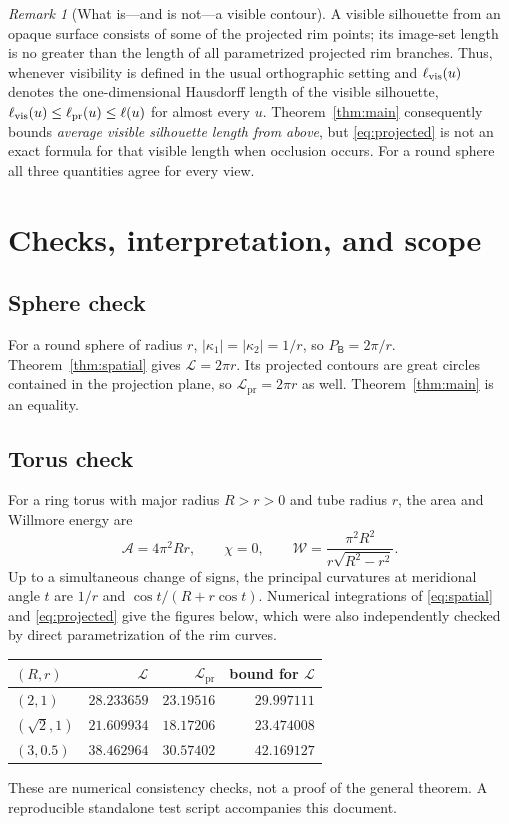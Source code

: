 \documentclass[10pt,a4paper]{article}
\theoremstyle{remark}\newtheorem{remark}[theorem]{Remark}
\newcommand{\A}{\mathcal A}
\newcommand{\W}{\mathcal W}
\newcommand{\Lc}{\mathcal L}
\newcommand{\Lp}{\mathcal L_{\mathrm{pr}}}
\newcommand{\Bop}{\mathsf B}
\begin{document}
\begin{remark}[What is---and is not---a visible contour]\label{rem:visible}
A visible silhouette from an opaque surface consists of some of the projected rim points; its image-set length is no greater than the length of all parametrized projected rim branches. Thus, whenever visibility is defined in the usual orthographic setting and $\ell_{\rm vis}(u)$ denotes the one-dimensional Hausdorff length of the visible silhouette,
$\ell_{\rm vis}(u)\leq\ell_{\rm pr}(u)\leq\ell(u)$ for almost every $u$.
Theorem~\ref{thm:main} consequently bounds \emph{average visible silhouette length from above}, but \eqref{eq:projected} is not an exact formula for that visible length when occlusion occurs. For a round sphere all three quantities agree for every view.
\end{remark}

\section{Checks, interpretation, and scope}
\subsection*{Sphere check}
For a round sphere of radius $r$, $|\kappa_1|=|\kappa_2|=1/r$, so $P_\Bop=2\pi/r$. Theorem~\ref{thm:spatial} gives $\Lc=2\pi r$. Its projected contours are great circles contained in the projection plane, so $\Lp=2\pi r$ as well. Theorem~\ref{thm:main} is an equality.

\subsection*{Torus check}
For a ring torus with major radius $R>r>0$ and tube radius $r$, the area and Willmore energy are
\[
\A=4\pi^2Rr,\qquad \chi=0,\qquad
\W=\frac{\pi^2R^2}{r\sqrt{R^2-r^2}}.
\]
Up to a simultaneous change of signs, the principal curvatures at meridional angle $t$ are $1/r$ and $\cos t/(R+r\cos t)$. Numerical integrations of \eqref{eq:spatial} and \eqref{eq:projected} give the figures below, which were also independently checked by direct parametrization of the rim curves.
\begin{center}\small
\begin{tabular}{@{}lrrr@{}}\toprule
$(R,r)$ & $\Lc$ & $\Lp$ & bound for $\Lc$\\\midrule
$(2,1)$ & $28.233659$ & $23.19516$ & $29.997111$\\
$(\sqrt2,1)$ & $21.609934$ & $18.17206$ & $23.474008$\\
$(3,0.5)$ & $38.462964$ & $30.57402$ & $42.169127$\\\bottomrule
\end{tabular}
\end{center}
These are numerical consistency checks, not a proof of the general theorem. A reproducible standalone test script accompanies this document.
\end{document}
